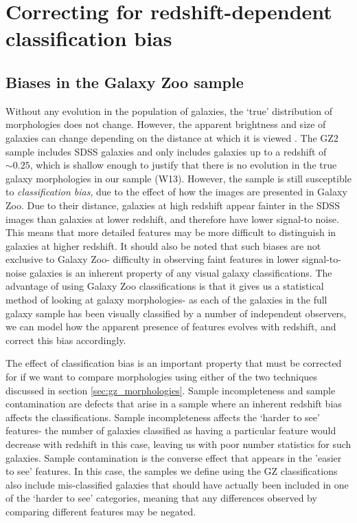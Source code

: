 \documentclass[useAMS,usenatbib]{mn2e}
\begin{document}
\section{Correcting for redshift-dependent classification bias}
\label{sec:redshift_bias}
\subsection{Biases in the Galaxy Zoo sample}
\label{sec:biases}
Without any evolution in the population of galaxies, the `true' distribution of morphologies does not change. However, the apparent brightness and size of galaxies can change depending on the distance at which it is viewed \citep{Bamford_09}. The GZ2 sample includes SDSS galaxies and only includes galaxies up to a redshift of $\sim 0.25$, which is shallow enough to justify that there is no evolution in the true galaxy morphologies in our sample (W13). However, the sample is still susceptible to \textit{classification bias}, due to the effect of how the images are presented in Galaxy Zoo. Due to their distance, galaxies at high redshift appear fainter in the SDSS images than galaxies at lower redshift, and therefore have lower signal-to noise. This means that more detailed features may be more difficult to distinguish in galaxies at higher redshift. It should also be noted that such biases are not exclusive to Galaxy Zoo- difficulty in observing faint features in lower signal-to-noise galaxies is an inherent property of any visual galaxy classifications. The advantage of using Galaxy Zoo classifications is that it gives us a statistical method of looking at galaxy morphologies- as each of the galaxies in the full galaxy sample has been visually classified by a number of independent observers, we can model how the apparent presence of features evolves with redshift, and correct this bias accordingly.

The effect of classification bias is an important property that must be corrected for if we want to compare morphologies using either of the two techniques discussed in section \ref{sec:gz_morphologies}. Sample incompleteness and sample contamination are defects that arise in a sample where an inherent redshift bias affects the classifications.  Sample incompleteness affects the `harder to see' features- the number of galaxies classified as having a particular feature would decrease with redshift in this case, leaving us with poor number statistics for such galaxies.  Sample contamination is the converse effect that appears in the 'easier to see' features.  In this case, the samples we define using the GZ classifications also include mis-classified galaxies that should have actually been included in one of the `harder to see' categories, meaning that any differences observed by comparing different features may be negated. 
\end{document}

